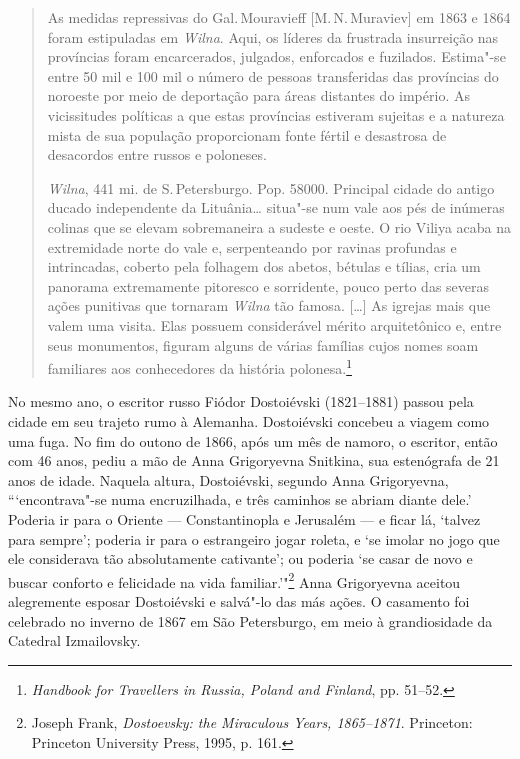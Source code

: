 \begin{quote}
As medidas repressivas do Gal.\,Mouravieff {[}M.\,N.\,Muraviev{]} em 1863 e
1864 foram estipuladas em \textit{Wilna}. Aqui, os líderes da frustrada
insurreição nas províncias foram encarcerados, julgados, enforcados e
fuzilados. Estima"-se entre 50 mil e 100 mil o número de pessoas
transferidas das províncias do noroeste por meio de deportação para
áreas distantes do império. As vicissitudes políticas a que estas
províncias estiveram sujeitas e a natureza mista de sua população
proporcionam fonte fértil e desastrosa de desacordos entre russos e
poloneses.

%

\textit{Wilna}, 441 mi. de S.\,Petersburgo. Pop. 58000. Principal cidade do antigo
ducado independente da Lituânia\ldots{} situa"-se num vale aos pés de
inúmeras colinas que se elevam sobremaneira a sudeste e oeste. O rio
Viliya acaba na extremidade norte do vale e, serpenteando por ravinas
profundas e intrincadas, coberto pela folhagem dos abetos, bétulas e
tílias, cria um panorama extremamente pitoresco e sorridente, pouco
perto das severas ações punitivas que tornaram \textit{Wilna} tão famosa.
[\ldots{}] As igrejas mais que valem uma visita. Elas possuem considerável
mérito arquitetônico e, entre seus monumentos, figuram alguns de várias
famílias cujos nomes soam familiares aos conhecedores da história
polonesa.\footnote{\textit{Handbook for Travellers in Russia, Poland and Finland}, pp. 51--52.} 
\end{quote}

No mesmo ano, o escritor russo Fiódor Dostoiévski (1821--1881) passou
pela cidade em seu trajeto rumo à Alemanha. Dostoiévski concebeu a
viagem como uma fuga. No fim do outono de 1866, após um mês de namoro, o
escritor, então com 46 anos, pediu a mão de Anna Grigoryevna Snitkina,
sua estenógrafa de 21 anos de idade. Naquela altura, Dostoiévski,
segundo Anna Grigoryevna, ```encontrava"-se numa encruzilhada, e três
caminhos se abriam diante dele.' Poderia ir para o Oriente ---
Constantinopla e Jerusalém --- e ficar lá, `talvez para sempre'; poderia
ir para o estrangeiro jogar roleta, e `se imolar no jogo que ele
considerava tão absolutamente cativante'; ou poderia `se casar de novo e
buscar conforto e felicidade na vida familiar.'"\footnote{Joseph Frank, \textit{Dostoevsky: the Miraculous Years, 1865--1871}. Princeton: Princeton University Press, 1995, p. 161.} Anna Grigoryevna aceitou alegremente esposar Dostoiévski e salvá"-lo das más ações. O casamento
foi celebrado no inverno de 1867 em São Petersburgo, em meio à
grandiosidade da Catedral Izmailovsky.


